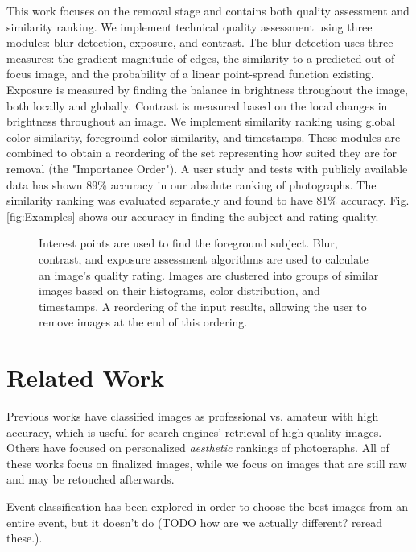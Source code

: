 \documentclass{sig-alternate}
\begin{document}
This work focuses on the removal stage and contains both quality assessment and similarity ranking. We implement technical quality assessment using three modules: blur detection, exposure, and contrast. The blur detection uses three measures: the gradient magnitude of edges, the similarity to a predicted out-of-focus image, and the probability of a linear point-spread function existing. Exposure is measured by finding the balance in brightness throughout the image, both locally and globally. Contrast is measured based on the local changes in brightness throughout an image. We implement similarity ranking using global color similarity, foreground color similarity, and timestamps.  These modules are combined to obtain a reordering of the set representing how suited they are for removal (the "Importance Order"). A user study and tests with publicly available data has shown 89\% accuracy in our absolute ranking of photographs. The similarity ranking was evaluated separately and found to have 81\% accuracy. Fig. \ref{fig:Examples} shows our accuracy in finding the subject and rating quality.

\begin{figure*}
  \centering
  \caption{Interest points are used to find the foreground subject. Blur, contrast, and exposure assessment algorithms are used to calculate an image's quality rating. Images are clustered into groups of similar images based on their histograms, color distribution, and timestamps. A reordering of the input results, allowing the user to remove images at the end of this ordering.}
  \label{flowchart}
\end{figure*}

\section{Related Work}

Previous works have classified images as professional vs. amateur with high accuracy\cite{1640788}\cite{springerlink:10.1007/11744078_23}\cite{springerlink:10.1007/978-3-540-88690-7_29}, which is useful for search engines' retrieval of high quality images. Others have focused on personalized \emph{aesthetic} rankings of photographs\cite {Sun:2009:PAB:1631272.1631351}\cite {Yeh:2010:PPR:1873951.1873963}. All of these works focus on finalized images, while we focus on images that are still raw and may be retouched afterwards.

Event classification has been explored in order to choose the best images from an entire event\cite{1223566}\cite{4444209}, but it doesn't do (TODO how are we actually different? reread these.).
\end{document}
